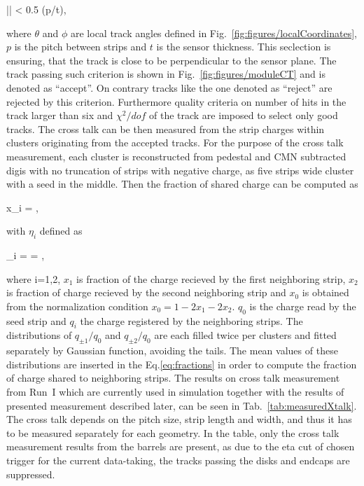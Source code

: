 {
|\theta {}\phi| < 0.5 \times (p/t),
}

where $\theta$ and $\phi$ are local track angles defined in Fig.~\ref{fig:figures/localCoordinates}, $p$ is the pitch between strips and $t$ is the sensor thickness. This seclection is ensuring, that the track is close to be perpendicular to the sensor plane. The track passing such criterion is shown in Fig.~\ref{fig:figures/moduleCT} and is denoted as ``accept''. On contrary tracks like the one denoted as ``reject'' are rejected by this criterion. Furthermore quality criteria on number of hits in the track larger than six and $\chi^{2}/dof$ of the track are imposed to select only good tracks. The cross talk can be then measured from the strip charges within clusters originating from the accepted tracks. For the purpose of the cross talk measurement, each cluster is reconstructed from pedestal and CMN subtracted digis with no truncation of strips with negative charge, as five strips wide cluster with a seed in the middle. Then the fraction of shared charge can be computed as


{
x_{i} =  ,
}

with $\eta_{i}$ defined as

{
\eta_{\pm i} =  =  ,
}

where i=1,2, $x_{1}$ is fraction of the charge recieved by the first neighboring strip,  $x_{2}$ is fraction of charge recieved by the second neighboring strip and $x_{0}$ is obtained from the normalization condition $x_{0} = 1-2x_{1}-2x_{2}$. $q_{0}$ is the charge read by the seed strip and $q_{i}$ the charge registered by the neighboring strips. The distributions of $q_{\pm 1}/q_{0}$ and $q_{\pm 2}/q_{0}$ are each filled twice per clusters and fitted separately by Gaussian function, avoiding the tails. The mean values of these distributions are inserted in the Eq.\ref{eq:fractions} in order to compute the fraction of charge shared to neighboring strips. The results on cross talk measurement from Run~I which are currently used in simulation together with the results of presented measurement described later, can be seen in Tab.~\ref{tab:measuredXtalk}. The cross talk depends on the pitch size, strip length and width, and thus it has to be measured separately for each geometry. In the table, only the cross talk measurement results from the barrels are present, as due to the eta cut of chosen trigger for the current data-taking, the tracks passing the disks and endcaps are suppressed. 

